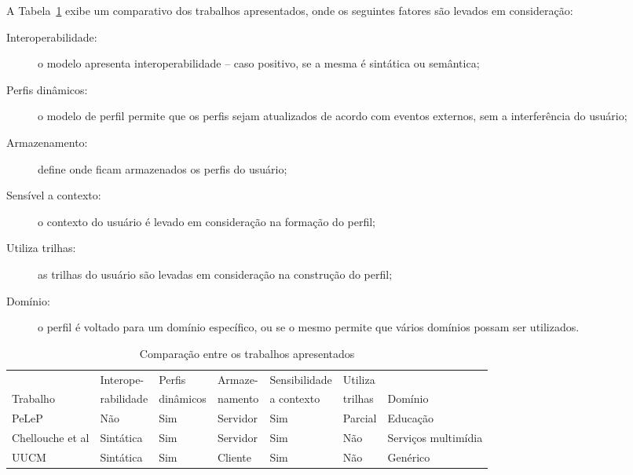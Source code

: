 A Tabela~\ref{tab:comparacao} exibe um comparativo dos trabalhos apresentados, onde os seguintes fatores são levados em consideração:


\begin{description}
  \item[Interoperabilidade:] o modelo apresenta interoperabilidade -- caso positivo, se a mesma é sintática ou semântica;
  \item[Perfis dinâmicos:] o modelo de perfil permite que os perfis sejam atualizados de acordo com eventos externos, sem a interferência do usuário;
  \item[Armazenamento:] define onde ficam armazenados os perfis do usuário;
  \item[Sensível a contexto:] o contexto do usuário é levado em consideração na formação do perfil;
  \item[Utiliza trilhas:] as trilhas do usuário são levadas em consideração na construção do perfil;
  \item[Domínio:] o perfil é voltado para um domínio específico, ou se o mesmo permite que vários domínios possam ser utilizados.
\end{description}

\begin{table}\centering\footnotesize
  \begin{tabular*}{1\textwidth}{@{}lllllll@{}}
    \toprule
                                         & Interope-  & Perfis    & Armaze-  & Sensibilidade & Utiliza & \\
    Trabalho                             & rabilidade & dinâmicos & namento  & a contexto    & trilhas & Domínio \\
    \midrule
    PeLeP \cite{pelep}                   & Não        & Sim       & Servidor & Sim           & Parcial & Educação \\
    Chellouche et al \cite{chellouche10} & Sintática  & Sim       & Servidor & Sim           & Não     & Serviços multimídia \\
    UUCM \cite{niederee04}               & Sintática  & Sim       & Cliente  & Sim           & Não     & Genérico \\
    \bottomrule
  \end{tabular*}
  \caption{Comparação entre os trabalhos apresentados}
  \label{tab:comparacao}
\end{table}
